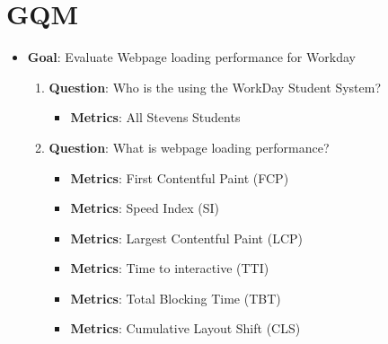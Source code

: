 \section{GQM}
\begin{itemize}
    \item \textbf{Goal}: Evaluate Webpage loading performance for Workday
    \begin{enumerate}
        \item \textbf{Question}: Who is the using the WorkDay Student System?
        \begin{itemize}
            \item \textbf{Metrics}: All Stevens Students
        \end{itemize}        
        \item \textbf{Question}: What is webpage loading performance?
        \begin{itemize}
            \item \textbf{Metrics}: First Contentful Paint (FCP)
            \item \textbf{Metrics}: Speed Index (SI)
            \item \textbf{Metrics}: Largest Contentful Paint (LCP) 
            \item \textbf{Metrics}: Time to interactive (TTI)
            \item \textbf{Metrics}: Total Blocking Time (TBT) 
            \item \textbf{Metrics}: Cumulative Layout Shift (CLS)
        \end{itemize}
    \end{enumerate}        
\end{itemize}